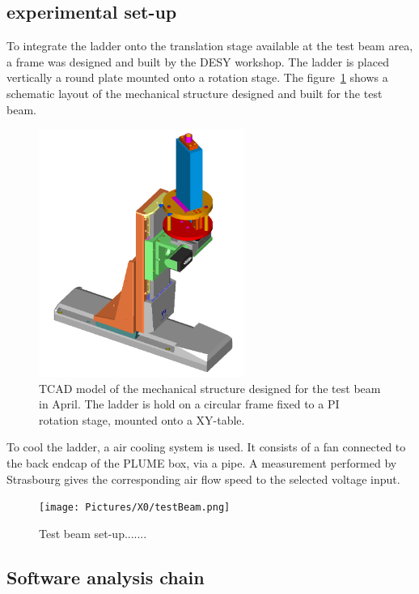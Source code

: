     \subsection{experimental set-up}

    To integrate the ladder onto the translation stage available at the test beam area, a frame was designed and built by the DESY workshop.
    The ladder is placed vertically a round plate mounted onto a rotation stage. 
    The figure~\ref{fig:mechanics} shows a schematic layout of the mechanical structure designed and built for the test beam.

    \begin{figure}
      \centering
      \includegraphics[width = 0.6\textwidth]{Pictures/X0/Frame/Testbeam1.PNG}
      \caption{TCAD model of the mechanical structure designed for the test beam in April. The ladder is hold on a circular frame fixed to a PI rotation stage, mounted onto a XY-table.}
      \label{fig:mechanics}
    \end{figure}

    To cool the ladder, a air cooling system is used. 
    It consists of a fan connected to the back endcap of the PLUME box, via a pipe. 
    A measurement performed by Strasbourg gives the corresponding air flow speed to the selected voltage input.  

    \begin{figure}
      \centering
      \texttt{[image: Pictures/X0/testBeam.png]}
      \caption{Test beam set-up.......}
      \label{fig:testBeam}
    \end{figure}

    \subsection{Software analysis chain}

